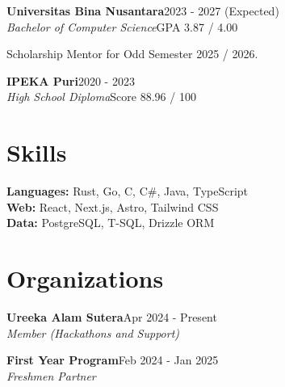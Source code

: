 \documentclass[a4paper,11pt]{article}
\newcommand{\entry}[4]{%
  \textbf{#1}\hfill{\color{muted}#2}\\[0.15em]
  {\color{muted}\textit{#3}}\hfill{\color{muted}#4}\par\vspace{0.15em}%
}
\begin{document}
\entry{Universitas Bina Nusantara}{2023 - 2027 (Expected)}{Bachelor of Computer Science}{GPA 3.87 / 4.00}
\begin{tight}
  \item Scholarship Mentor for Odd Semester 2025 / 2026.
\end{tight}
\vspace{0.4em}

\entry{IPEKA Puri}{2020 - 2023}{High School Diploma}{Score 88.96 / 100}

\section{Skills}
\textbf{Languages:} Rust, Go, C, C\#, Java, TypeScript \\
\textbf{Web:} React, Next.js, Astro, Tailwind CSS \\
\textbf{Data:} PostgreSQL, T-SQL, Drizzle ORM

\section{Organizations}
\entry{Ureeka Alam Sutera}{Apr 2024 - Present}{Member (Hackathons and Support)}{}
\vspace{0.3em}
\entry{First Year Program}{Feb 2024 - Jan 2025}{Freshmen Partner}{}
\end{document}
